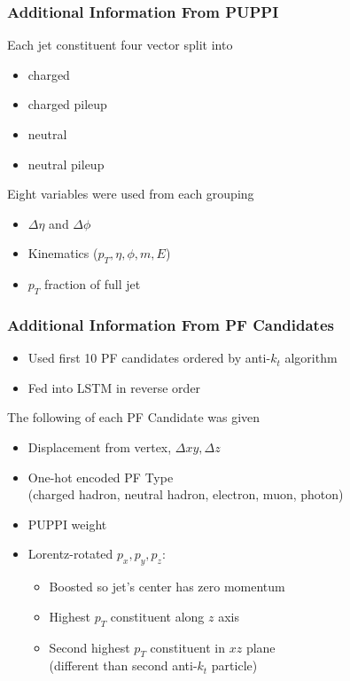 \documentclass{beamer}
\begin{document}
\begin{frame}
  \frametitle{Additional Information From PUPPI}

  Each jet constituent four vector split into

  \begin{itemize}
  \item charged
  \item charged pileup
  \item neutral
  \item neutral pileup
  \end{itemize}

  Eight variables were used from each grouping 

  \begin{itemize}
  \item $\Delta \eta$ and $\Delta \phi$
  \item Kinematics ($p_T, \eta, \phi, m, E$)
  \item $p_T$ fraction of full jet
  \end{itemize}

\end{frame}

\begin{frame}
  \frametitle{Additional Information From PF Candidates}

  \begin{itemize}
  \item Used first 10 PF candidates ordered by anti-$k_t$ algorithm
  \item Fed into LSTM in reverse order
  \end{itemize}

  The following of each PF Candidate was given

  \begin{itemize}
  \item Displacement from vertex, $\Delta xy, \Delta z$
  \item One-hot encoded PF Type \\
    (charged hadron, neutral hadron, electron, muon, photon)
  \item PUPPI weight
  \item Lorentz-rotated $p_x, p_y, p_z$:
    \begin{itemize}
    \item Boosted so jet's center has zero momentum
    \item Highest $p_T$ constituent along $z$ axis
    \item Second highest $p_T$ constituent in $xz$ plane \\
      (different than second anti-$k_t$ particle)
    \end{itemize}
  \end{itemize}

\end{frame}
\end{document}
